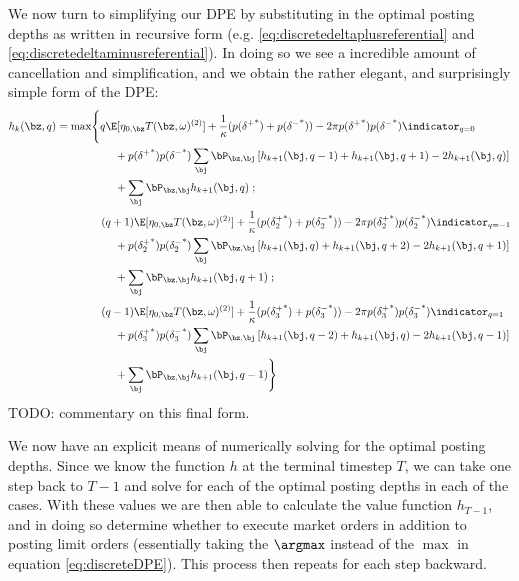 \documentclass[12pt]{article}
\begin{document}
We now turn to simplifying our DPE by substituting in the optimal posting depths as written in recursive form (e.g. \ref{eq:discretedeltaplusreferential} and \ref{eq:discretedeltaminusreferential}). In doing so we see a incredible amount of cancellation and simplification, and we obtain the rather elegant, and surprisingly simple form of the DPE:
\begin{equation}
\label{eq:discreteDPE}
\begin{split}
h_k(\bz,q) & = \max \Biggl\lbrace 
q\E[\eta_{0,\bz} T(\bz, \omega)^{(2)}] + \frac{1}{\kappa}(p({\delta^+}^*)+p({\delta^-}^*)) -2\pi p({\delta^+}^*)p({\delta^-}^*) \indicator_{q=0} \\ 
& \hphantom{{}={} \max \biggl\lbrace {}+{}} + p({\delta^+}^*)p({\delta^-}^*)\sum_\bj \bP_{\bz,\bj} \left[ h_{k+1}(\bj, q-1) + h_{k+1}(\bj, q+1) -2 h_{k+1}(\bj, q)  \right] \\
& \hphantom{{}={} \max \biggl\lbrace {}+{}} + \sum_{\bj} \bP_{\bz,\bj} h_{k+1}(\bj,q)  \; ;\\
& \hphantom{{}={} \max \biggl\lbrace} (q+1)\E[\eta_{0,\bz} T(\bz, \omega)^{(2)}] + \frac{1}{\kappa}(p({\delta_{2}^+}^*)+p({\delta_{2}^-}^*)) -2\pi p({\delta_{2}^+}^*)p({\delta_{2}^-}^*) \indicator_{q=-1} \\ 
& \hphantom{{}={} \max \biggl\lbrace {}+{}} + p({\delta_{2}^+}^*)p({\delta_{2}^-}^*)\sum_\bj \bP_{\bz,\bj} \left[ h_{k+1}(\bj, q) + h_{k+1}(\bj, q+2) -2 h_{k+1}(\bj, q+1)  \right] \\
& \hphantom{{}={} \max \biggl\lbrace {}+{}} + \sum_{\bj} \bP_{\bz,\bj} h_{k+1}(\bj,q+1) \; ;\\
& \hphantom{{}={} \max \biggl\lbrace} (q-1)\E[\eta_{0,\bz} T(\bz, \omega)^{(2)}] + \frac{1}{\kappa}(p({\delta_3^+}^*)+p({\delta_3^-}^*)) -2\pi p({\delta_3^+}^*)p({\delta_3^-}^*) \indicator_{q=1} \\ 
& \hphantom{{}={} \max \biggl\lbrace {}+{}} + p({\delta_3^+}^*)p({\delta_3^-}^*)\sum_\bj \bP_{\bz,\bj} \left[ h_{k+1}(\bj, q-2) + h_{k+1}(\bj, q) -2 h_{k+1}(\bj, q-1)  \right] \\
& \hphantom{{}={} \max \biggl\lbrace {}+{}} + \sum_{\bj} \bP_{\bz,\bj} h_{k+1}(\bj,q-1)  \Biggr\rbrace
\end{split}
\end{equation}
TODO: commentary on this final form.

We now have an explicit means of numerically solving for the optimal posting depths. Since we know the function $h$ at the terminal timestep $T$, we can take one step back to $T-1$ and solve for each of the optimal posting depths in each of the cases. With these values we are then able to calculate the value function $h_{T-1}$, and in doing so determine whether to execute market orders in addition to posting limit orders (essentially taking the $\argmax$ instead of the $\max$ in equation \ref{eq:discreteDPE}). This process then repeats for each step backward.
\end{document}
